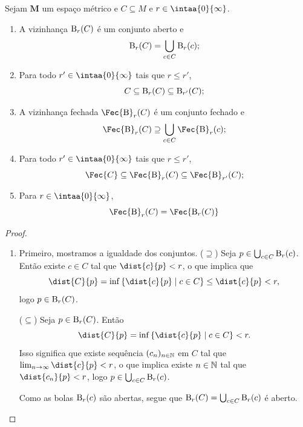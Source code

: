 \begin{exerc}
Sejam $\bm M$ um espaço métrico e $C \subseteq M$ e $r \in \intaa{0}{\infty}$.
	\begin{enumerate}
	\item A vizinhança $\mathrm{B}_r(C) $ é um conjunto aberto e
		\begin{equation*}
		\mathrm{B}_r(C) = \bigcup_{c \in C} \mathrm{B}_r(c);
		\end{equation*}
	\item  Para todo $r' \in \intaa{0}{\infty}$ tais que $r \leq r'$,
		\begin{equation*}
		C \subseteq \mathrm{B}_r(C) \subseteq \mathrm{B}_{r'}(C);
		\end{equation*}
	\item A vizinhança fechada $\Fec{\bola}_r(C) $ é um conjunto fechado e
		\begin{equation*}
		\Fec{\bola}_r(C) \supseteq \bigcup_{c \in C} \Fec{\bola}_r(c);
		\end{equation*}
	\item  Para todo $r' \in \intaa{0}{\infty}$ tais que $r \leq r'$,
		\begin{equation*}
		\Fec{C} \subseteq \Fec{\bola}_r(C) \subseteq \Fec{\bola}_{r'}(C);
		\end{equation*}
	\item Para $r \in \intaa{0}{\infty}$,
		\begin{equation*}
		\Fec{\bola}_r(C) = \Fec{\bola_r(C)}
		\end{equation*}
	\end{enumerate}
\end{exerc}
\begin{proof}
	\begin{enumerate}
	\item Primeiro, mostramos a igualdade dos conjuntos. ($\supseteq$) Seja $p \in \bigcup_{c \in C} \mathrm{B}_r(c)$. Então existe $c \in C$ tal que $\dist{c}{p} < r$, o que implica que
	\begin{equation*}
	\dist{C}{p} = \inf \set{\dist{c}{p}}{c \in C} \leq \dist{c}{p} < r,
	\end{equation*}
logo $p \in \mathrm{B}_r(C)$.

($\subseteq$) Seja $p \in \mathrm{B}_r(C)$. Então
	\begin{equation*}
	\dist{C}{p} = \inf \set{\dist{c}{p}}{c \in C} < r.
	\end{equation*}
Isso significa que existe sequência $(c_n)_{n \in \mathbb{N}}$ em $C$ tal que $\lim_{n \conv \infty} \dist{c}{p} < r$, o que implica existe $n \in \mathbb{N}$ tal que $\dist{c_n}{p}<r$, logo $p \in \bigcup_{c \in C} \mathrm{B}_r(c)$.

Como as bolas $\mathrm{B}_r(c)$ são abertas, segue que $\mathrm{B}_r(C) = \bigcup_{c \in C} \mathrm{B}_r(c)$ é aberto.
	\end{enumerate}
\end{proof}


